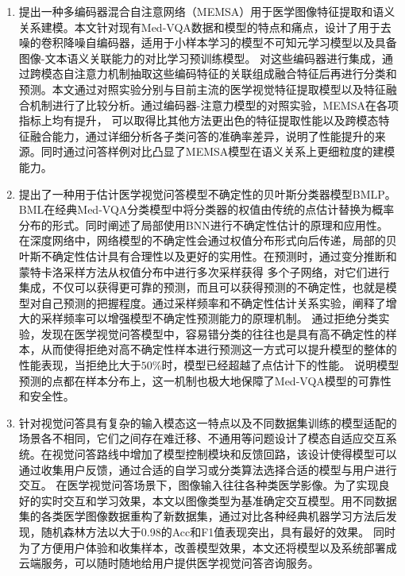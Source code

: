 \begin{enumerate}[topsep = 0 pt, itemsep= 0 pt, parsep=0pt, partopsep=0pt, leftmargin=0pt, itemindent=44pt, labelsep=6pt, label=(\arabic*)]
    \item 提出一种多编码器混合自注意网络（MEMSA）用于医学图像特征提取和语义关系建模。本文针对现有Med-VQA数据和模型的特点和痛点，设计了用于去噪的卷积降噪自编码器，适用于小样本学习的模型不可知元学习模型以及具备图像-文本语义关联能力的对比学习预训练模型。
    对这些编码器进行集成，通过跨模态自注意力机制抽取这些编码特征的关联组成融合特征后再进行分类和预测。本文通过对照实验分别与目前主流的医学视觉特征提取模型以及特征融合机制进行了比较分析。通过编码器-注意力模型的对照实验，MEMSA在各项指标上均有提升，
    可以取得比其他方法更出色的特征提取性能以及跨模态特征融合能力，通过详细分析各子类问答的准确率差异，说明了性能提升的来源。同时通过问答样例对比凸显了MEMSA模型在语义关系上更细粒度的建模能力。
    \item 提出了一种用于估计医学视觉问答模型不确定性的贝叶斯分类器模型BMLP。BML在经典Med-VQA分类模型中将分类器的权值由传统的点估计替换为概率分布的形式。同时阐述了局部使用BNN进行不确定性估计的原理和应用性。
    在深度网络中，网络模型的不确定性会通过权值分布形式向后传递，局部的贝叶斯不确定性估计具有合理性以及更好的实用性。在预测时，通过变分推断和蒙特卡洛采样方法从权值分布中进行多次采样获得
    多个子网络，对它们进行集成，不仅可以获得更可靠的预测，而且可以获得预测的不确定性，也就是模型对自己预测的把握程度。通过采样频率和不确定性估计关系实验，阐释了增大的采样频率可以增强模型不确定性预测能力的原理机制。
    通过拒绝分类实验，发现在医学视觉问答模型中，容易错分类的往往也是具有高不确定性的样本，从而使得拒绝对高不确定性样本进行预测这一方式可以提升模型的整体的性能表现，当拒绝比大于$50\%$时，模型已经超越了点估计下的性能。
    说明模型预测的点都在样本分布上，这一机制也极大地保障了Med-VQA模型的可靠性和安全性。
    \item 针对视觉问答具有复杂的输入模态这一特点以及不同数据集训练的模型适配的场景各不相同，它们之间存在难迁移、不通用等问题设计了模态自适应交互系统。在视觉问答路线中增加了模型控制模块和反馈回路，该设计使得模型可以通过收集用户反馈，通过合适的自学习或分类算法选择合适的模型与用户进行交互。
    在医学视觉问答场景下，图像输入往往各种类医学影像。为了实现良好的实时交互和学习效果，本文以图像类型为基准确定交互模型。用不同数据集的各类医学图像数据重构了新数据集，通过对比各种经典机器学习方法后发现，随机森林方法以大于0.98的Acc和F1值表现突出，具有最好的效果。
    同时为了方便用户体验和收集样本，改善模型效果，本文还将模型以及系统部署成云端服务，可以随时随地给用户提供医学视觉问答咨询服务。
\end{enumerate}

